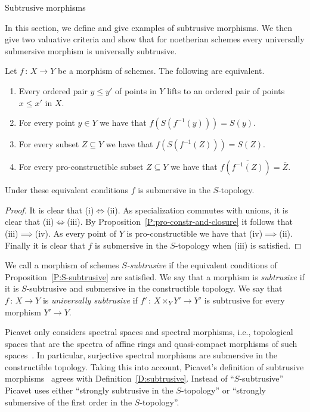 \documentclass[a4paper,twoside,11pt]{amsart}[2009/07/02] %
\newcommand{\pref}[1]{\eqref{#1}}
\newcommand{\map}[3]{#1\,:\, #2\rightarrow #3}
\begin{document}
\begin{section}{Subtrusive morphisms}\label{S:subtrusive}

In this section, we define and give examples of subtrusive morphisms. We then
give two valuative criteria and show that for noetherian schemes every
universally submersive morphism is universally subtrusive.

\begin{proposition}\label{P:S-subtrusive}
Let $\map{f}{X}{Y}$ be a morphism of schemes. The following are equivalent.
\begin{enumerate}
\item Every ordered pair $y\leq y'$ of points in $Y$ lifts to an
ordered pair of points $x\leq x'$ in $X$.
\label{PI:SS-pairs}
\item For every point $y\in Y$ we have that
$f(S(f^{-1}(y)))=S(y)$.
\item For every subset $Z\subseteq Y$ we have that
$f(S(f^{-1}(Z)))=S(Z)$.
\item For every pro-constructible subset $Z\subseteq Y$ we have that
$f\left(\overline{f^{-1}(Z)}\right)=\overline{Z}$.
\end{enumerate}
Under these equivalent conditions $f$ is submersive in the $S$-topology.
\end{proposition}
\begin{proof}
It is clear that (i)$\iff$(ii). As specialization commutes with unions, it is
clear that (ii)$\iff$(iii). By Proposition~\pref{P:pro-constr-and-closure} it
follows that (iii)$\implies$(iv). As every point of $Y$ is pro-constructible we
have that (iv)$\implies$(ii). Finally it is clear that $f$ is submersive in the
$S$\nobreakdash-topology when (iii) is satisfied.
\end{proof}

\begin{definition}\label{D:subtrusive}
We call a morphism of schemes \emph{$S$-subtrusive} if the equivalent
conditions of Proposition~\pref{P:S-subtrusive} are satisfied.
We say that a morphism is \emph{subtrusive} if it is $S$-subtrusive and
submersive in the constructible topology.
%
We say that $\map{f}{X}{Y}$ is \emph{universally subtrusive} if
$\map{f'}{X\times_Y Y'}{Y'}$ is subtrusive for every morphism $Y'\to Y$.
\end{definition}

\begin{remark}
Picavet only considers spectral spaces and spectral morphisms, i.e.,
topological spaces that are the spectra of affine rings and quasi-compact
morphisms of such spaces~\cite{hochster_prime_ideal_structure}.
%
In particular, surjective spectral morphisms are submersive in the constructible
topology. Taking this into account, Picavet's definition of subtrusive
morphisms~\cite[D\'ef.~2]{picavet_submersion} agrees with
Definition~\pref{D:subtrusive}. Instead of ``$S$-subtrusive'' Picavet uses
either ``strongly subtrusive in the $S$-topology'' or ``strongly submersive
of the first order in the $S$-topology''.


\end{remark}
\end{section}
\end{document}
